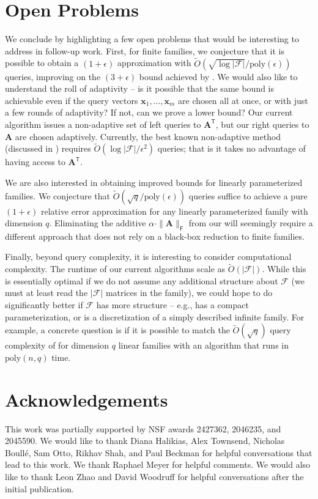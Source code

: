 \documentclass{article}[11pt]
\theoremstyle{definition}
\newcommand{\poly}{\mathrm{poly}}
\newcommand{\bv}[1]{\boldsymbol{\mathbf{#1}}}
\newcommand{\T}{\mathsf{T}}
\newcommand{\Fro}{\mathsf{F}}
\newcommand{\F}{\mathcal{F}}
\newcommand{\transpose}{\mathsf{T}}
\begin{document}
\section{Open Problems}
\label{sec:open_problems}
We conclude by highlighting a few open problems that would be interesting to address in follow-up work. First, for finite families, we conjecture that it is possible to obtain a $(1+\epsilon)$ approximation with $\tilde{O}(\sqrt{\log |\F|}/\poly(\epsilon))$ queries, improving on the $(3+\epsilon)$ bound achieved by . We would also like to understand the roll of adaptivity -- is it possible that the same bound is achievable even if the query vectors $\bv{x}_1, \ldots, \bv{x}_m$ are chosen all at once, or with just a few rounds of adaptivity? If not, can we prove a lower bound? Our current algorithm issues a non-adaptive set of left queries to $\bv{A}^\transpose$, but our right queries to $\bv{A}$ are chosen adaptively. Currently, the best known non-adaptive method (discussed in ) requires $\tilde {O}(\log |\F|/\epsilon^2)$ queries; that is it takes no advantage of having access to $\bv A^\T$.

We are also interested in obtaining improved bounds for linearly parameterized families. We conjecture that $\tilde{O}(\sqrt{q}/\poly(\epsilon))$ queries suffice to achieve a pure $(1+\epsilon)$ relative error approximation for any linearly parameterized family with dimension $q$. Eliminating the additive $\alpha\cdot \|\bv{A}\|_\Fro$ from our  will seemingly require a different approach that does not rely on a black-box reduction to finite families. 

Finally, beyond query complexity, it is interesting to consider computational complexity. The runtime of our current algorithms scale as $\tilde{O}(|\mathcal{F}|)$. While this is essentially optimal if we do not assume any additional structure about $\mathcal{F}$ (we must at least read the $|\mathcal{F}|$ matrices in the family), we could hope to do significantly better if $\mathcal{F}$ has more structure -- e.g., has a compact parameterization, or is a discretization of a simply described infinite family. For example, a concrete question is if it is possible to match the $\tilde{O}(\sqrt{q})$ query complexity of  for dimension $q$ linear families with an algorithm that runs in $\poly(n,q)$ time.

\section*{Acknowledgements} This work was partially supported by NSF awards 2427362, 2046235, and 2045590. We would like to thank Diana Halikias, Alex Townsend, Nicholas Boullé, Sam Otto, Rikhav Shah, and Paul Beckman for helpful conversations that lead to this work. We thank Raphael Meyer for helpful comments. We would also like to thank Leon Zhao and David Woodruff for helpful conversations after the initial publication. 
\end{document}
